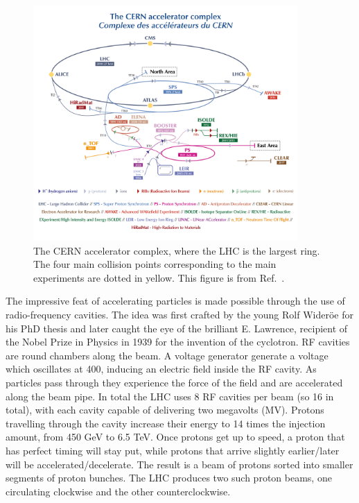 \begin{figure}
  \includegraphics[width=0.9\textwidth]{Figures/LHC/CernAcceleratorComplex.png}
  \caption[The \CERN accelerator complex]%
  {The CERN accelerator complex, where the LHC is the largest ring. The four main collision points corresponding to the main experiments are dotted in yellow. This figure is from Ref.~\cite{Mobs:2684277}.}
  \label{fig:CERNComplex}
\end{figure}

The impressive feat of accelerating particles is made possible through the use of radio-frequency cavities. The idea was first crafted by the young Rolf Wideröe \cite{vretenar2012radio} for his PhD thesis and later caught the eye of the brilliant E. Lawrence, recipient of the Nobel Prize in Physics in 1939 for the invention of the cyclotron. RF cavities are round chambers along the beam. A voltage generator generate a voltage which oscillates at \unit{400}{\mega\hertz}, inducing an electric field inside the RF cavity. As particles pass through they experience the force of the field and are accelerated along the beam pipe. In total the LHC uses 8 RF cavities per beam (so 16 in total), with each cavity capable of delivering two megavolts (MV). Protons travelling through the cavity increase their energy to 14 times the injection amount, from 450 GeV to 6.5 TeV. Once protons get up to speed, a proton that has perfect timing will stay put, while protons that arrive slightly earlier/later will be accelerated/decelerate. The result is a beam of protons sorted into smaller segments of proton bunches. The LHC produces two such proton beams, one circulating clockwise and the other counterclockwise. 

